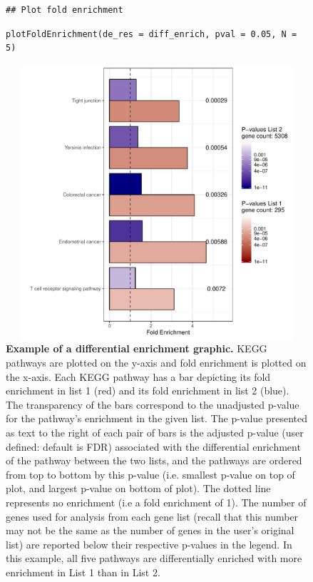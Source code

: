 \documentclass[article]{jss}\usepackage[]{graphicx}\usepackage[]{color}
\makeatletter
\newenvironment{kframe}{%
 \def\at@end@of@kframe{}%
 \ifinner\ifhmode%
  \def\at@end@of@kframe{\end{minipage}}%
  \begin{minipage}{\columnwidth}%
 \fi\fi%
 \def\FrameCommand##1{\hskip\@totalleftmargin \hskip-\fboxsep
 \colorbox{shadecolor}{##1}\hskip-\fboxsep
     \hskip-\linewidth \hskip-\@totalleftmargin \hskip\columnwidth}%
 \MakeFramed {\advance\hsize-\width
   \@totalleftmargin\z@ \linewidth\hsize
   \@setminipage}}%
 {\par\unskip\endMakeFramed%
 \at@end@of@kframe}
\newenvironment{knitrout}{}{} %
\makeatother
\begin{document}
\begin{figure}[H]
\begin{knitrout}
\color{fgcolor}\begin{kframe}
\begin{lstlisting}[basicstyle=\ttfamily,breaklines=true]
## Plot fold enrichment\end{lstlisting}
\begin{lstlisting}[basicstyle=\ttfamily,breaklines=true]
plotFoldEnrichment(de_res = diff_enrich, pval = 0.05, N = 5)\end{lstlisting}
\end{kframe}
\includegraphics[width=5.0in,height=4in]{figure/visualization_2-1} 

\end{knitrout}
\caption{\label{fig:barchart} \textbf{Example of a differential enrichment graphic.}
KEGG pathways are plotted on the y-axis and fold enrichment is
plotted on the x-axis. Each KEGG pathway has a bar depicting its
fold enrichment in list 1 (red) and its fold enrichment in list 2
(blue). The transparency of the bars correspond to the unadjusted
p-value for the pathway's enrichment in the given list. The p-value
presented as text to the right of each pair of bars is the adjusted
p-value (user defined: default is FDR) associated with the
differential enrichment of the pathway between the two lists, and
the pathways are ordered from top to bottom by this p-value (i.e.
smallest p-value on top of plot, and largest p-value on bottom of
plot). The dotted line represents no enrichment (i.e a fold enrichment of 1).
The number of genes used for analysis from each gene list (recall
that this number may not be the same as the number of genes in
the user’s original list) are reported below their respective
p-values in the legend. In this example, all five pathways are
differentially enriched with more enrichment in List 1 than in
List 2.}
\end{figure}
\end{document}
